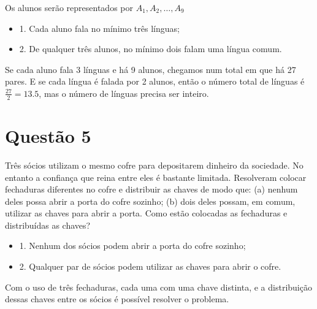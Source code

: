 \vspace{10pt}

Os alunos serão representados por \( A_1, A_2, \dots, A_9 \)

\vspace{10pt}

\begin{itemize}
    \item 1. Cada aluno fala no mínimo três línguas;
    \item 2. De qualquer três alunos, no mínimo dois falam uma língua comum.
\end{itemize}

\vspace{10pt}

Se cada aluno fala 3 línguas e há 9 alunos, chegamos num total em que há 27 pares. E se cada língua é falada por 2 alunos, então o número total de línguas é $\frac{27}{2} = 13.5$, mas o número de línguas precisa ser inteiro.

\vspace{10pt}


\section*{Questão 5}

Três sócios utilizam o mesmo cofre para depositarem dinheiro da sociedade. No entanto a confiança que reina entre eles é bastante limitada. Resolveram colocar fechaduras diferentes no cofre e distribuir as chaves de modo que: (a) nenhum deles possa abrir a porta do cofre sozinho; (b) dois deles possam, em comum, utilizar as chaves para abrir a porta. Como estão colocadas as fechaduras e distribuídas as chaves?

\vspace{10pt}

\begin{itemize}
    \item 1. Nenhum dos sócios podem abrir a porta do cofre sozinho;
    \item 2. Qualquer par de sócios podem utilizar as chaves para abrir o cofre.
\end{itemize}

\vspace{10pt}

Com o uso de três fechaduras, cada uma com uma chave distinta, e a distribuição dessas chaves entre os sócios é possível resolver o problema. 

